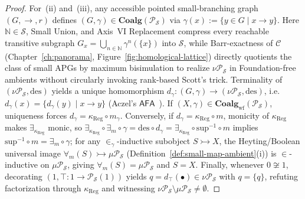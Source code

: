 \begin{proof}
For~(ii) and~(iii), any accessible pointed small-branching graph $(G, \to, r)$ defines $(G, \gamma) \in \mathbf{Coalg}(\mathcal{P}_{\mathcal{S}})$ via $\gamma(x) := \{y \in G \mid x \to y\}$. Here $\mathbb{N} \in \mathcal{S}$, Small Union, and Axis~VI Replacement compress every reachable transitive subgraph $G_x = \bigcup_{n \in \mathbb{N}} \gamma^n(\{x\})$ into $\mathcal{S}$, while Barr-exactness of $\mathcal{C}$ (Chapter~\ref{ch:panorama}, Figure~\ref{fig:homological-lattice}) directly quotients the class of small APGs by maximum bisimulation to realize $\nu \mathcal{P}_{\mathcal{S}}$ in Foundation-free ambients without circularly invoking rank-based Scott's trick. Terminality of $(\nu \mathcal{P}_{\mathcal{S}}, \mathrm{des})$ yields a unique homomorphism $d_\gamma : (G, \gamma) \to (\nu \mathcal{P}_{\mathcal{S}}, \mathrm{des})$, i.e.\ $d_\gamma(x) = \{d_\gamma(y) \mid x \to y\}$ (Aczel's $\mathsf{AFA}$~\cite[Chs.~1--2]{Aczel88}). If $(X, \gamma) \in \mathbf{Coalg}_{\mathrm{wf}}(\mathcal{P}_{\mathcal{S}})$, uniqueness forces $d_\gamma = \kappa_{\mathrm{Reg}} \circ m_\gamma$. Conversely, if $d_\gamma = \kappa_{\mathrm{Reg}} \circ m$, monicity of $\kappa_{\mathrm{Reg}}$ makes $\exists_{\kappa_{\mathrm{Reg}}}$ monic, so $\exists_{\kappa_{\mathrm{Reg}}} \circ \exists_m \circ \gamma = \mathrm{des} \circ d_\gamma = \exists_{\kappa_{\mathrm{Reg}}} \circ \mathrm{sup}^{-1} \circ m$ implies $\mathrm{sup}^{-1} \circ m = \exists_m \circ \gamma$; for any $\in_\gamma$-inductive subobject $S \rightarrowtail X$, the Heyting/Boolean universal image $\forall_m(S) \rightarrowtail \mu \mathcal{P}_{\mathcal{S}}$ (Definition~\ref{def:small-map-ambient}(i)) is $\in$-inductive on $\mu \mathcal{P}_{\mathcal{S}}$, giving $\forall_m(S) = \mu \mathcal{P}_{\mathcal{S}}$ and $S = X$. Finally, whenever $0 \not\cong 1$, decorating $(1, \top : 1 \to \mathcal{P}_{\mathcal{S}}(1))$ yields $q = d_\top(\bullet) \in \nu \mathcal{P}_{\mathcal{S}}$ with $q = \{q\}$, refuting factorization through $\kappa_{\mathrm{Reg}}$ and witnessing $\nu \mathcal{P}_{\mathcal{S}} \setminus \mu \mathcal{P}_{\mathcal{S}} \neq \emptyset$.
\end{proof}

